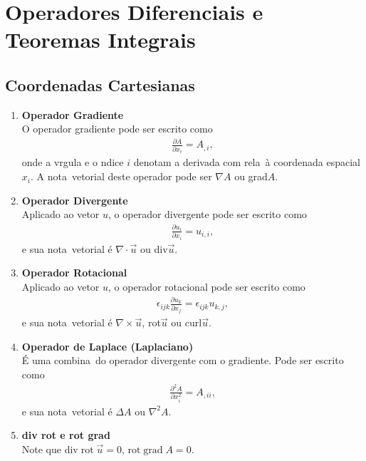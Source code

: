 
\section{Operadores Diferenciais e Teoremas Integrais }

\subsection {Coordenadas Cartesianas}

\begin{enumerate}

\item {\bf Operador Gradiente}\\
O operador gradiente pode ser escrito como
\begin{eqnarray}
\frac{\partial A}{\partial x_{i}} = A_{,i},
\end{eqnarray}
onde a v\ih rgula e o \ih ndice $i$ denotam a derivada com
rela\cao\ \`a coordenada espacial $x_{i}$. A nota\cao\ vetorial
deste operador pode ser $\nabla A$ ou grad$A$.

\item {\bf Operador Divergente}\\
Aplicado ao vetor $u$, o operador divergente pode ser escrito
como
\begin{eqnarray}
\frac{\partial u_{i}}{\partial x_{i}} = u_{i,i},
\end{eqnarray}
e sua nota\cao\ vetorial \'e $\nabla\!\cdot\!\vec{u}$ ou div$\vec{u}$.

\item {\bf Operador Rotacional}\\
Aplicado ao vetor $u$, o operador rotacional pode ser escrito
como
\begin{eqnarray}
\epsilon_{ijk}\frac{\partial u_{k}}{\partial x_{j}} =
\epsilon_{ijk}u_{k,j},
\end{eqnarray}
e sua nota\cao\ vetorial \'e $\nabla\!\times\!\vec{u}$, rot$\vec{u}$ ou
curl$\vec{u}$.

\item {\bf Operador de Laplace (Laplaciano)}\\
\'E uma combina\cao\ do operador divergente com
o gradiente. Pode ser escrito como
\begin{eqnarray}
\frac{\partial^{2}A}{\partial x_{i}^{2}} = A_{,ii},
\end{eqnarray}
e sua nota\cao\ vetorial \'e $\Delta A$ ou $\nabla^{2}A$.
\\

\item{\bf div rot e rot grad}\\
Note que $\mbox{div}\;\mbox{rot}\;\vec{u} = 0$, $\mbox{rot}\;\mbox{grad}\; A = 0$.
\\


\end{enumerate}
